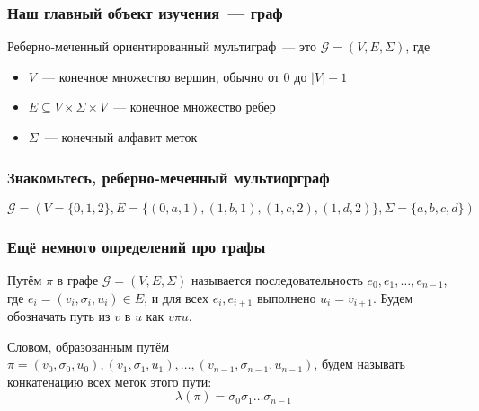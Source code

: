 \documentclass[
    aspectratio=169,
]{beamer}
\begin{document}
\begin{frame}
    \frametitle{Наш главный объект изучения~--- граф}

    \begin{definition}
        Реберно-меченный ориентированный мультиграф~--- это $\mathcal{G} = (V, E, \Sigma)$, где
        \begin{itemize}
            \item $V$~--- конечное множество вершин, обычно от 0 до $|V| - 1$
            \item $E \subseteq V \times \Sigma \times V $~--- конечное множество ребер
            \item $\Sigma$~--- конечный алфавит меток
        \end{itemize}
    \end{definition}

\end{frame}

\begin{frame}
    \frametitle{Знакомьтесь, реберно-меченный мультиорграф}

    \begin{center}
    \end{center}

    \[\mathcal{G} = (V = \{0, 1, 2\}, E = \{(0, a, 1), (1, b, 1), (1, c, 2), (1, d, 2)\},\Sigma = \{a, b, c, d\})\]
\end{frame}

\begin{frame}
    \frametitle{Ещё немного определений про графы}

    \begin{definition}
        Путём $\pi$ в графе $\mathcal{G} = (V, E, \Sigma)$ называется последовательность $e_0, e_1, \dots, e_{n-1}$, где $e_i = (v_i, \sigma_i, u_i) \in E$, и для всех $e_i, e_{i+1}$ выполнено $u_i = v_{i+1}$.
        Будем обозначать путь из $v$ в $u$ как $v \pi u$.
    \end{definition}

    \begin{definition}
        Словом, образованным путём $\pi = (v_0, \sigma_0, u_0), (v_1, \sigma_1, u_1), \dots, (v_{n-1}, \sigma_{n-1}, u_{n-1})$, будем называть конкатенацию всех меток этого пути:
        \[\lambda(\pi) = \sigma_0 \sigma_1 \dots \sigma_{n-1}\]
    \end{definition}

\end{frame}
\end{document}
